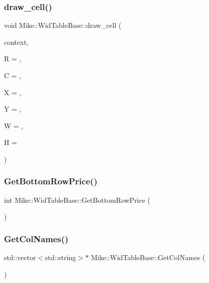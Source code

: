 \subsubsection{\texorpdfstring{draw\+\_\+cell()}{draw\_cell()}}
{\footnotesize\ttfamily void Mike\+::\+Wid\+Table\+Base\+::draw\+\_\+cell (\begin{DoxyParamCaption}\item[{Table\+Context}]{context,  }\item[{int}]{R = {},  }\item[{int}]{C = {},  }\item[{int}]{X = {},  }\item[{int}]{Y = {},  }\item[{int}]{W = {},  }\item[{int}]{H = {} }\end{DoxyParamCaption})\hspace{0.3cm}{\ttfamily [protected]}}

\mbox{\label{class_mike_1_1_wid_table_base_af29863e5a1695c64a748133b335ecc16}} 
\subsubsection{\texorpdfstring{Get\+Bottom\+Row\+Price()}{GetBottomRowPrice()}}
{\footnotesize\ttfamily int Mike\+::\+Wid\+Table\+Base\+::\+Get\+Bottom\+Row\+Price (\begin{DoxyParamCaption}{ }\end{DoxyParamCaption})\hspace{0.3cm}{\ttfamily [inline]}}

\mbox{\label{class_mike_1_1_wid_table_base_a8fab1137b438a8ae331c9ceeaae43acb}} 
\subsubsection{\texorpdfstring{Get\+Col\+Names()}{GetColNames()}}
{\footnotesize\ttfamily std\+::vector$<$std\+::string$>$$\ast$ Mike\+::\+Wid\+Table\+Base\+::\+Get\+Col\+Names (\begin{DoxyParamCaption}{ }\end{DoxyParamCaption})\hspace{0.3cm}{\ttfamily [inline]}}

